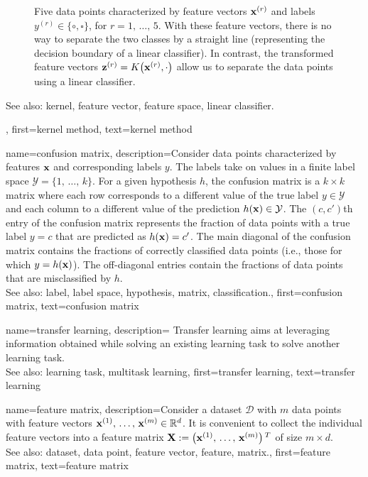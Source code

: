{{{\begin{figure}[H]
\begin{center}
\end{center}
\caption{
Five data points characterized by feature vectors ${\bf x}^{(r)}$ 
and labels $y^{(r)} \in \{ \circ, \square \}$, for $r=1, \,\ldots, \,5$. 
With these feature vectors, there is no way to separate the two classes 
by a straight line (representing the decision boundary of a linear classifier). 
In contrast, the transformed feature vectors ${\bf z}^{(r)} = K\big({\bf x}^{(r)},\cdot\big)$ 
allow us to separate the data points using a linear classifier.  \label{fig_linsep_kernel_dict}}
\end{figure}
		See also: kernel, feature vector, feature space, linear classifier.},
	first={kernel method},
	text={kernel method} 
}
	

{name={confusion matrix}, 
	description={Consider data points characterized 
		by features ${\bf x}$ and corresponding labels $y$. 
		The labels take on values in a finite label space $\mathcal{Y} = \{1, \,\ldots, \,k\}$. 
		For a given hypothesis $h$, the confusion matrix is a 
		$k \times k$ matrix where each row corresponds to a different 
		value of the true label $y \in \mathcal{Y}$ and each column to a 
		different value of the prediction $h({\bf x}) \in \mathcal{Y}$. 
		The $(c,c')$th entry of the confusion matrix represents the fraction of 
		data points with a true label $y = c$ that are predicted as 
		$h({\bf x}) = c'$. The main diagonal of the confusion matrix 
		contains the fractions of correctly classified data points (i.e., those for which 
		$y = h({\bf x})$). The off-diagonal entries contain the fractions of
		data points that are misclassified by $h$.
				\\
		See also: label, label space, hypothesis, matrix, classification.},
	first={confusion matrix},
	text={confusion matrix} 
}

{name={transfer learning},
  description=
  {Transfer learning aims at leveraging information obtained while solving an existing learning task to 
   solve another learning task.\\ 
   See also: learning task, multitask learning},
  first={transfer learning},
  text={transfer learning}
}



{name={feature matrix}, 
	description={Consider a dataset $\mathcal{D}$ 
		with $m$ data points with feature vectors 
		${\bf x}^{(1)}, \,\ldots, \,{\bf x}^{(m)} \in \mathbb{R}^{d}$. 
		It is convenient to collect the individual feature vectors into a feature 
		matrix ${\bf X} := \big({\bf x}^{(1)}, \,\ldots, \,{\bf x}^{(m)}\big)\,^{T}$ 
		of size $m \times d$.
				\\
		See also: dataset, data point, feature vector, feature, matrix.},
	first={feature matrix},
	text={feature matrix} 
}

}
